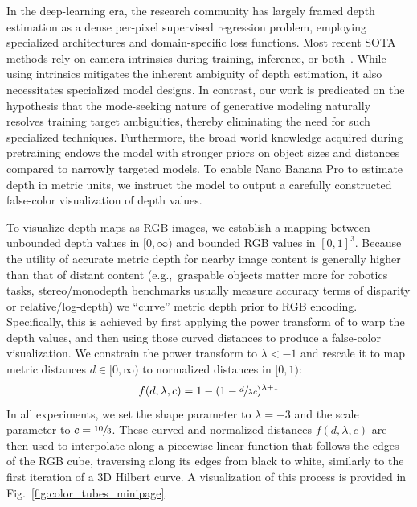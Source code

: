 \documentclass[11pt, a4paper, copyright, gdm]{google}
\begin{document}
In the deep-learning era, the research community has largely framed depth estimation as a dense per-pixel supervised regression problem, employing specialized architectures and domain-specific loss functions. Most recent SOTA methods rely on camera intrinsics during training, inference, or both~\citep{yang2024dav2,bochkovskii2024depthpro,wang2024moge,wang2025moge2,lotus2,he2024lotus,hu2024metric3dv2,depthlm,dav3,piccinelli2025unidepthv2,unik3d}.
While using intrinsics mitigates the inherent ambiguity of depth estimation, it also necessitates specialized model designs. 
In contrast, our work is predicated on the hypothesis that the mode-seeking nature of generative modeling naturally resolves training target ambiguities, thereby eliminating the need for such specialized techniques.
Furthermore, the broad world knowledge acquired during pretraining endows the model with stronger priors on object sizes and distances compared to narrowly targeted models.
To enable Nano Banana Pro to estimate depth in metric units, we instruct the model to output a carefully constructed false-color visualization of depth values.

\newcommand\lft{\mathopen{}\left}
\newcommand\rgt{\aftergroup\mathclose\aftergroup{\aftergroup}\right}
\newcommand{\power}{\lambda}

To visualize depth maps as RGB images, we establish a mapping between unbounded depth values in $[0, \infty)$ and bounded RGB values in $[0, 1]^3$. 
Because the utility of accurate metric depth for nearby image content is generally higher than that of distant content (e.g.,\ graspable objects matter more for robotics tasks, stereo/monodepth benchmarks usually measure accuracy terms of disparity or relative/log-depth) we ``curve'' metric depth prior to RGB encoding.
Specifically, this is achieved by first applying the power transform of \citet{barron2025power}  to warp the depth values, and then using those curved distances to produce a false-color visualization. 
We constrain the power transform to $\power < -1$ and rescale it to map metric distances $d \in [0, \infty)$ to normalized distances in $[0, 1)$:
\begin{equation}
  f(d, \power, c) = 1 - \lft( 1 - \sfrac{d}{\power c}  \rgt)^{\power + 1}
\end{equation}
In all experiments, we set the shape parameter to $\power = -3$ and the scale parameter to $c = \sfrac{10}{3}$. These curved and normalized distances $f(d, \power, c)$ are then used to interpolate along a piecewise-linear function that follows the edges of the RGB cube, traversing along its edges from black to white, similarly to the first iteration of a 3D Hilbert curve. A visualization of this process is provided in Fig.~\ref{fig:color_tubes_minipage}. 
\end{document}
